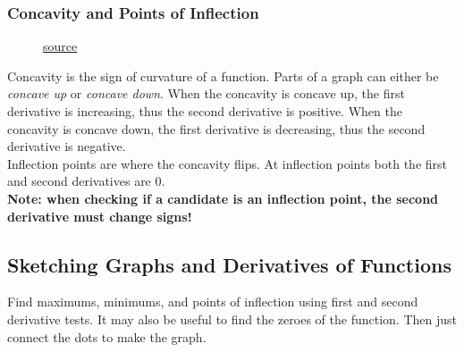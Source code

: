\documentclass[12pt]{article}
\begin{document}
            \subsubsection{Concavity and Points of Inflection}
                \begin{figure}
                    \begin{center}
                    \end{center}
                    \caption{\href{https://www.khanacademy.org/math/ap-calculus-ab/ab-diff-analytical-applications-new/ab-5-6b/a/review-analyzing-the-second-derivative-to-find-inflection-points}{source}}
                    \label{fig:concavityinflection}
                \end{figure}

                Concavity is the sign of curvature of a function. Parts of a graph can either be \textit{concave up} or \textit{concave down}. When the concavity is concave up, the first derivative is increasing, thus the second derivative is positive. When the concavity is concave down, the first derivative is decreasing, thus the second derivative is negative.
                \\ Inflection points are where the concavity flips. At inflection points both the first and second derivatives are $0$.
                \\ \textbf{Note: when checking if a candidate is an inflection point, the second derivative must change signs!}

        \subsection{Sketching Graphs and Derivatives of Functions} %
            Find maximums, minimums, and points of inflection using first and second derivative tests. It may also be useful to find the zeroes of the function. Then just connect the dots to make the graph.
\end{document}
